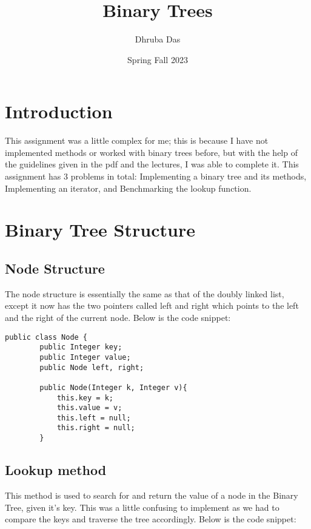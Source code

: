 \documentclass[a4paper,11pt]{article}
\begin{document}
\title{
    \textbf{Binary Trees}
}
\author{Dhruba Das}
\date{Spring Fall 2023}

\maketitle

\section*{Introduction}
This assignment was a little complex for me; this is because I have not implemented methods or worked with binary trees before, but with the help of the guidelines given in the pdf and the lectures, I was able to complete it. This assignment has 3 problems in total: Implementing a binary tree and its methods, Implementing an iterator, and Benchmarking the lookup function.

\section*{Binary Tree Structure}

\subsection*{Node Structure}

The node structure is essentially the same as that of the doubly linked list, except it now has the two pointers called left and right which points to the left and the right of the current node. Below is the code snippet:

\begin{verbatim}
public class Node {
        public Integer key;
        public Integer value;
        public Node left, right;
    
        public Node(Integer k, Integer v){
            this.key = k;
            this.value = v;
            this.left = null;
            this.right = null;
        }
\end{verbatim}

\subsection*{Lookup method}
This method is used to search for and return the value of a node in the Binary Tree, given it's key. This was a little confusing to implement as we had to compare the keys and traverse the tree accordingly. Below is the code snippet:
\end{document}
